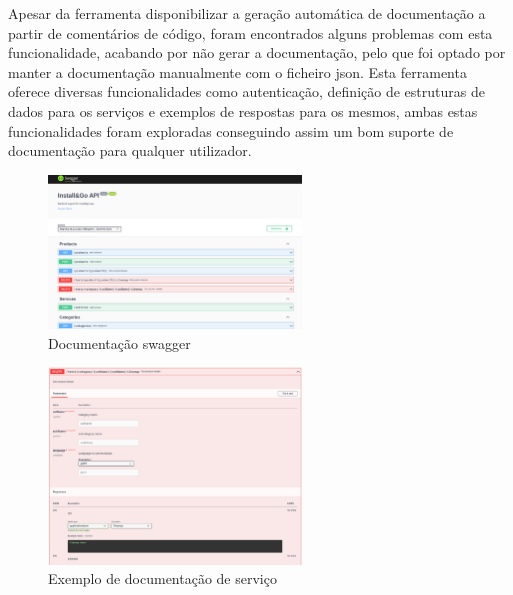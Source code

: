 Apesar da ferramenta disponibilizar a geração automática de documentação a partir de comentários de código, foram encontrados alguns problemas com esta funcionalidade, acabando por não gerar a documentação, pelo que foi optado por manter a documentação manualmente com o ficheiro json. Esta ferramenta oferece diversas funcionalidades como autenticação, definição de estruturas de dados para os serviços e exemplos de respostas para os mesmos, ambas estas funcionalidades foram exploradas conseguindo assim um bom suporte de documentação para qualquer utilizador.

\begin{figure}[htb]
  \centering
  \includegraphics[width=0.6\textwidth]{images/implementacao/api/swagger_intro.png}
  \caption{Documentação swagger}
  \label{fig:66}
\end{figure}

\begin{figure}[htb]
  \centering
  \includegraphics[width=0.6\textwidth]{images/implementacao/api/swagger_pedido.png}
  \caption{Exemplo de documentação de serviço}
  \label{fig:67}
\end{figure}